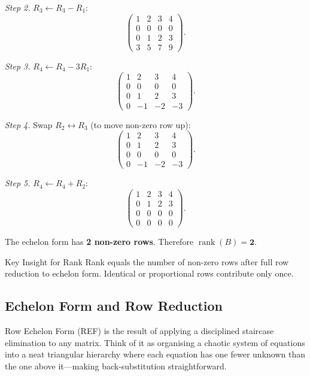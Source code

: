 \documentclass[12pt,a4paper]{article}
\begin{document}
\textit{Step 2.} $R_3 \leftarrow R_3 - R_1$:
\[
\begin{pmatrix} 1 & 2 & 3 & 4 \\ 0 & 0 & 0 & 0 \\ 0 & 1 & 2 & 3 \\ 3 & 5 & 7 & 9 \end{pmatrix}.
\]

\textit{Step 3.} $R_4 \leftarrow R_4 - 3R_1$:
\[
\begin{pmatrix} 1 & 2 & 3 & 4 \\ 0 & 0 & 0 & 0 \\ 0 & 1 & 2 & 3 \\ 0 & -1 & -2 & -3 \end{pmatrix}.
\]

\textit{Step 4.} Swap $R_2 \leftrightarrow R_3$ (to move non-zero row up):
\[
\begin{pmatrix} 1 & 2 & 3 & 4 \\ 0 & 1 & 2 & 3 \\ 0 & 0 & 0 & 0 \\ 0 & -1 & -2 & -3 \end{pmatrix}.
\]

\textit{Step 5.} $R_4 \leftarrow R_4 + R_2$:
\[
\begin{pmatrix} 1 & 2 & 3 & 4 \\ 0 & 1 & 2 & 3 \\ 0 & 0 & 0 & 0 \\ 0 & 0 & 0 & 0 \end{pmatrix}.
\]

The echelon form has \textbf{2 non-zero rows}. Therefore $\operatorname{rank}(B) = \mathbf{2}$.

\begin{learnbox}{Key Insight for Rank}
Rank equals the number of non-zero rows after full row reduction to echelon form. Identical or proportional rows contribute only once.
\end{learnbox}

\subsection{Echelon Form and Row Reduction}

Row Echelon Form (REF) is the result of applying a disciplined staircase elimination to any matrix.
Think of it as organising a chaotic system of equations into a neat triangular hierarchy where
each equation has one fewer unknown than the one above it---making back-substitution straightforward.
\end{document}
